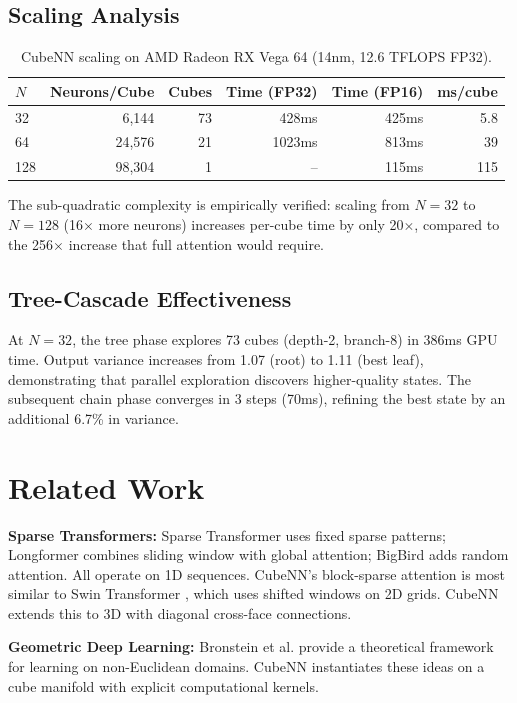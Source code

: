 \documentclass{article}
\begin{document}
\subsection{Scaling Analysis}

\begin{table}[h]
\centering
\caption{CubeNN scaling on AMD Radeon RX Vega 64 (14nm, 12.6 TFLOPS FP32).}
\begin{tabular}{lrrrrr}
\toprule
$N$ & Neurons/Cube & Cubes & Time (FP32) & Time (FP16) & ms/cube \\
\midrule
32  & 6,144  & 73 & 428ms & 425ms & 5.8 \\
64  & 24,576 & 21 & 1023ms & 813ms & 39 \\
128 & 98,304 & 1  & --     & 115ms & 115 \\
\bottomrule
\end{tabular}
\end{table}

The sub-quadratic complexity is empirically verified: scaling from $N{=}32$ to $N{=}128$ (16$\times$ more neurons) increases per-cube time by only 20$\times$, compared to the 256$\times$ increase that full attention would require.

\subsection{Tree-Cascade Effectiveness}

At $N{=}32$, the tree phase explores 73 cubes (depth-2, branch-8) in 386ms GPU time. Output variance increases from 1.07 (root) to 1.11 (best leaf), demonstrating that parallel exploration discovers higher-quality states. The subsequent chain phase converges in 3 steps (70ms), refining the best state by an additional 6.7\% in variance.

\section{Related Work}

\textbf{Sparse Transformers:} Sparse Transformer \cite{child2019generating} uses fixed sparse patterns; Longformer \cite{beltagy2020longformer} combines sliding window with global attention; BigBird \cite{zaheer2020bigbird} adds random attention. All operate on 1D sequences. CubeNN's block-sparse attention is most similar to Swin Transformer \cite{liu2021swin}, which uses shifted windows on 2D grids. CubeNN extends this to 3D with diagonal cross-face connections.

\textbf{Geometric Deep Learning:} Bronstein et al. \cite{bronstein2021geometric} provide a theoretical framework for learning on non-Euclidean domains. CubeNN instantiates these ideas on a cube manifold with explicit computational kernels.
\end{document}
